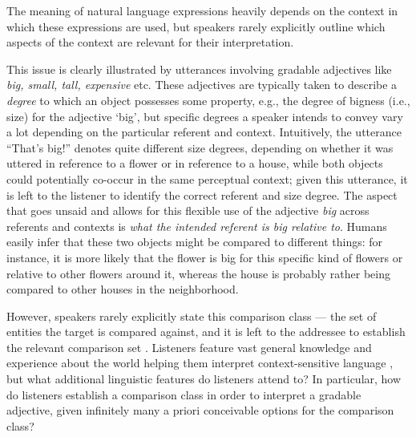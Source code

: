 The meaning of natural language expressions heavily depends on the context in which these expressions are used, but speakers rarely explicitly outline which aspects of the context are relevant for their interpretation. 

This issue is clearly illustrated by utterances involving gradable adjectives like \textit{big, small, tall, expensive} etc. These adjectives are typically taken to describe a \emph{degree} to which an object possesses some property, e.g., the degree of bigness (i.e., size) for the adjective ‘big’, but specific degrees a speaker intends to convey vary a lot depending on the particular referent and context. Intuitively, the utterance “That’s big!” denotes quite different size degrees, depending on whether it was uttered in reference to a flower or in reference to a house, while both objects could potentially co-occur in the same perceptual context; given this utterance, it is left to the listener to identify the correct referent and size degree. The aspect that goes unsaid and allows for this flexible use of the adjective \textit{big} across referents and contexts is \textit{what the intended referent is big relative to}. Humans easily infer that these two objects might be compared to different things: for instance, it is more likely that the flower is big for this specific kind of flowers or relative to other flowers around it, whereas the house is probably rather being compared to other houses in the neighborhood. 

However, speakers rarely explicitly state this comparison class --- the set of entities the target is compared against, and it is left to the addressee to establish the relevant comparison set \parencite{Solt2009}. Listeners feature vast general knowledge and experience about the world helping them interpret context-sensitive language \parencite{tessler2017warm}, but what additional linguistic features do listeners attend to? In particular, how do listeners establish a comparison class in order to interpret a gradable adjective, given infinitely many a priori conceivable options for the comparison class? 

